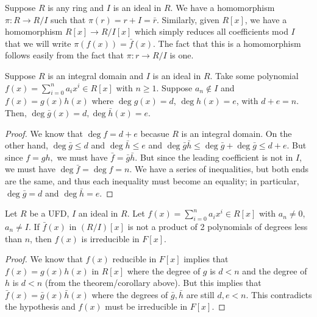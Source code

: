 \documentclass{../mathnotes}
\begin{document}
\begin{rem}
    Suppose $R$ is any ring and $I$ is an ideal in $R$. We have a homomorphism $\pi:R\to R/I$ such that $\pi(r)=r+I=\bar r$.
    Similarly, given $R[x]$, we have a homomorphism $R[x]\to R/I[x]$ which simply reduces all coefficients mod $I$ that we will
    write $\pi(f(x))=\bar f(x)$. The fact that this is a homomorphism follows easily from the fact that $\pi:r\to R/I$ is one.
\end{rem}

\begin{lem}
    Suppose $R$ is an integral domain and $I$ is an ideal in $R$. Take some polynomial $f(x)=\sum_{i=0}^na_ix^i\in R[x]$ with
    $n\geq 1$. Suppose $a_n\notin I$ and $f(x)=g(x)h(x)$ where $\deg g(x)=d$, $\deg h(x)=e$, with $d+e=n$. Then,
    $\deg \bar g(x)=d,\deg \bar h(x)=e$.
\end{lem}
\begin{proof}
    We know that $\deg f=d+e$ becasue $R$ is an integral domain. On the other hand, $\deg\bar g\leq d$ and $\deg \bar h\leq e$
    and $\deg \bar g\bar h\leq\deg \bar g+\deg\bar g\leq d+e$. But since $f=gh,$ we must have $\bar f=\bar g\bar h$. But since 
    the leading coefficient is not in $I$, we must have $\deg \bar f=\deg f=n$. We have a series of inequalities, but both ends
    are the same, and thus each inequality must become an equality; in particular, $\deg\bar g=d$ and $\deg\bar h=e$.
\end{proof}

\begin{thm}
    Let $R$ be a UFD, $I$ an ideal in $R$. Let $f(x)=\sum_{i=0}^na_ix^i\in R[x]$ with $a_n\neq 0$, $a_n\neq I$. If
    $\bar f(x)$ in $(R/I)[x]$ is not a product of 2 polynomials of degrees less than $n$, then $f(x)$ is irreducible
    in $F[x]$.
\end{thm}
\begin{proof}
    We know that $f(x)$ reducible in $F[x]$ implies that $f(x)=g(x)h(x)$ in $R[x]$ where the degree of $g$ is $d<n$ and the degree
    of $h$ is $d<n$ (from the theorem/corollary above). But this implies that $\bar f(x)=\bar g(x)\bar h(x)$ where the degrees
    of $\bar g,\bar h$ are still $d,e<n$. This contradicts the hypothesis and $f(x)$ must be irreducible in $F[x]$.
\end{proof}
\end{document}
